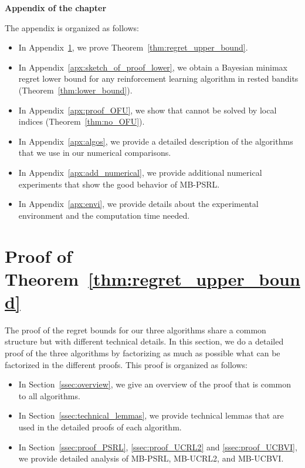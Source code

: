 \begin{subappendices}

\begin{center}
    \bfseries \Large Appendix of the chapter
\end{center}

The appendix is organized as follows:
\begin{itemize}
    \item In Appendix~\ref{apx:proof_thm1}, we prove Theorem~\ref{thm:regret_upper_bound}. 
    \item In Appendix~\ref{apx:sketch_of_proof_lower}, we obtain a Bayesian minimax regret lower bound for any reinforcement learning algorithm in rested bandits (Theorem~\ref{thm:lower_bound}).
    \item In Appendix~\ref{apx:proof_OFU}, we show that  cannot be solved by local indices (Theorem~\ref{thm:no_OFU}).
    \item In Appendix~\ref{apx:algos}, we provide a detailed description of the algorithms that we use in our numerical comparisons. 
    \item In Appendix~\ref{apx:add_numerical}, we provide additional numerical experiments that show the good behavior of MB-PSRL. 
    \item In Appendix~\ref{apx:envi}, we provide details about the experimental environment and the computation time needed. 
\end{itemize}

\section{Proof of Theorem~\ref{thm:regret_upper_bound}}
\label{apx:proof_thm1}

The proof of the regret bounds for our three algorithms share a common structure but with different technical details.  In this section, we do a detailed proof of the three algorithms by factorizing as much as possible what can be factorized in the different proofs. This proof is organized as follows:
\begin{itemize}
    \item In Section~\ref{ssec:overview}, we give an overview of the proof that is common to all algorithms. 
    \item In Section~\ref{ssec:technical_lemmas}, we provide technical lemmas that are used in the detailed proofs of each algorithm. 
    \item In Section~\ref{ssec:proof_PSRL}, \ref{ssec:proof_UCRL2} and \ref{ssec:proof_UCBVI}, we provide detailed analysis of MB-PSRL, MB-UCRL2, and MB-UCBVI. 
\end{itemize}


\end{subappendices}
